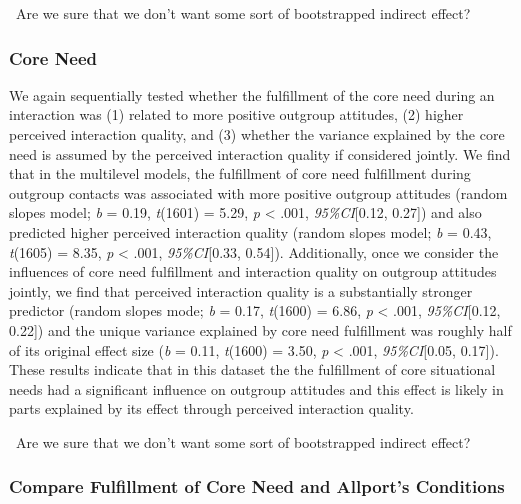 \faQuestionCircle~Are we sure that we don't want some sort of
bootstrapped indirect effect?

\subsubsection{Core Need}

We again sequentially tested whether the fulfillment of the core need
during an interaction was (1) related to more positive outgroup
attitudes, (2) higher perceived interaction quality, and (3) whether the
variance explained by the core need is assumed by the perceived
interaction quality if considered jointly. We find that in the
multilevel models, the fulfillment of core need fulfillment during
outgroup contacts was associated with more positive outgroup attitudes
(random slopes model; \textit{b} = 0.19, \textit{t}(1601) = 5.29,
\textit{p} \textless{} .001, \textit{95\%CI}{[}0.12, 0.27{]}) and also
predicted higher perceived interaction quality (random slopes model;
\textit{b} = 0.43, \textit{t}(1605) = 8.35, \textit{p} \textless{} .001,
\textit{95\%CI}{[}0.33, 0.54{]}). Additionally, once we consider the
influences of core need fulfillment and interaction quality on outgroup
attitudes jointly, we find that perceived interaction quality is a
substantially stronger predictor (random slopes mode; \textit{b} = 0.17,
\textit{t}(1600) = 6.86, \textit{p} \textless{} .001,
\textit{95\%CI}{[}0.12, 0.22{]}) and the unique variance explained by
core need fulfillment was roughly half of its original effect size
(\textit{b} = 0.11, \textit{t}(1600) = 3.50, \textit{p} \textless{}
.001, \textit{95\%CI}{[}0.05, 0.17{]}). These results indicate that in
this dataset the the fulfillment of core situational needs had a
significant influence on outgroup attitudes and this effect is likely in
parts explained by its effect through perceived interaction quality.

\faQuestionCircle~Are we sure that we don't want some sort of
bootstrapped indirect effect?

\subsubsection{Compare Fulfillment of Core Need and Allport's Conditions}

